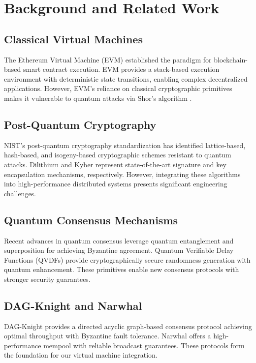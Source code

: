 \documentclass[11pt]{article}
\begin{document}
\section{Background and Related Work}

\subsection{Classical Virtual Machines}

The Ethereum Virtual Machine (EVM) \cite{ethereum} established the paradigm for blockchain-based smart contract execution. EVM provides a stack-based execution environment with deterministic state transitions, enabling complex decentralized applications. However, EVM's reliance on classical cryptographic primitives makes it vulnerable to quantum attacks via Shor's algorithm \cite{shor1997}.

\subsection{Post-Quantum Cryptography}

NIST's post-quantum cryptography standardization \cite{nist-pqc} has identified lattice-based, hash-based, and isogeny-based cryptographic schemes resistant to quantum attacks. Dilithium \cite{dilithium} and Kyber \cite{kyber} represent state-of-the-art signature and key encapsulation mechanisms, respectively. However, integrating these algorithms into high-performance distributed systems presents significant engineering challenges.

\subsection{Quantum Consensus Mechanisms}

Recent advances in quantum consensus \cite{quantum-consensus} leverage quantum entanglement and superposition for achieving Byzantine agreement. Quantum Verifiable Delay Functions (QVDFs) \cite{qvdf} provide cryptographically secure randomness generation with quantum enhancement. These primitives enable new consensus protocols with stronger security guarantees.

\subsection{DAG-Knight and Narwhal}

DAG-Knight \cite{dag-knight} provides a directed acyclic graph-based consensus protocol achieving optimal throughput with Byzantine fault tolerance. Narwhal \cite{narwhal} offers a high-performance mempool with reliable broadcast guarantees. These protocols form the foundation for our virtual machine integration.
\end{document}
